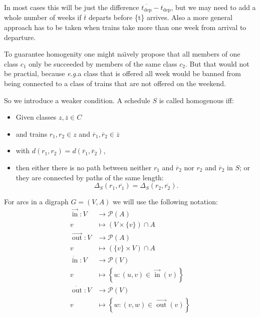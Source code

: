 \documentclass{amsart} %
\def\eg{\emph{e.g.}}
\def\naively{na\"{\i}vely}	%
\newcommand{\ol}[1]{\overline{#1}}
\DeclareMathOperator{\In}{in}
\DeclareMathOperator{\Out}{out}
\newcommand{\ina}{\ensuremath{\vec{\In}}}
\newcommand{\outa}{\ensuremath{\vec{\Out}}}
\newcommand{\inv}{\ensuremath{\dot{\In}}}
\newcommand{\outv}{\ensuremath{\dot{\Out}}}
\begin{document}
In most cases this will be just the difference \(\ol{t_{\textrm{dep}}}
- t_{\textrm{dep}}\), but we may need to add a whole number of weeks
if \(\ol{t}\) departs before \{t\} arrives.  Also a more general approach
has to be taken when trains take more than one week from arrival to
departure.

To guarantee homogenity one might \naively{} propose that all members
of one class \(c_1\) only be succeeded by members of the same class
\(c_2\).  But that would not be practial, because \eg a class that is
offered all week would be banned from being connected to a class of trains that
are not offered on the weekend.



So we introduce a weaker condition.  A schedule \(S\) is called
homogenous iff:
\begin{itemize}
\item Given classes \(z, \ol{z} \in C\)
\item and trains \(r_1, r_2 \in z\) and \(\ol{r}_1,\ol{r}_2 \in \ol{z}\)
\item with \( d (r_1, r_2) = d(\ol{r}_1, \ol{r}_2) \),
\item then either there is no path between neither \(r_1\) and
  \(\ol{r}_2\) nor \(r_2\) and \(\ol{r}_2\) in \(S\); or they are connected by paths of the same length:
\begin{equation}
\label{homoEq}
  \Delta_S (r_1, \ol{r_1}) = \Delta_S (r_2, \ol{r_2})\textrm{.}
\end{equation}
\end{itemize}

For arcs in a digraph \(G=(V,A)\) we will use the following notation:
\begin{align*}
\ina\colon  V &\to \mathcal{P}(A) \\
v &\mapsto \left(V \times \{v\}\right) \cap A\\
\outa\colon  V &\to \mathcal{P}(A) \\
v &\mapsto \left(\{v\} \times V\right) \cap A\\
\inv\colon  V &\to \mathcal{P}(V) \\
v &\mapsto \left\{ u \colon \left(u,v\right) \in \ina(v) \right\}\\
\outv\colon  V &\to \mathcal{P}(V) \\
v &\mapsto \left\{w \colon \left(v,w\right) \in \outa\left(v\right) \right\}\\
\end{align*}
\end{document}

